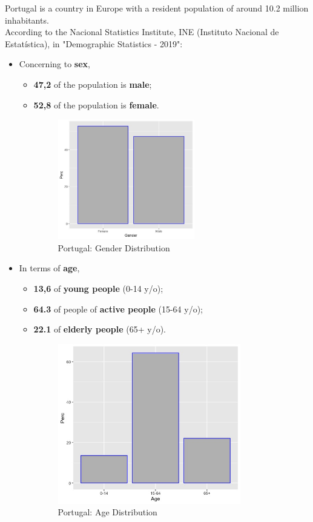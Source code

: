 Portugal is a country in Europe with a resident population of around 10.2 million inhabitants.  \\
According to the Nacional Statistics Institute, INE (Instituto Nacional de Estatística),  \cite{pubINE} in "Demographic Statistics - 2019":
\begin{itemize}
    \item Concerning to \textbf{sex},
    \begin{itemize}
        \item \textbf{47,2\textdiscount} of the population is \textbf{male};
        \item \textbf{52,8 \textdiscount} of the population is \textbf{female}.
\begin{figure}[h!]
\caption{Portugal: Gender Distribution}
\centering
\includegraphics[width=0.6\textwidth]{Sex.jpeg}
\end{figure}
    \end{itemize}  
    \item In terms of \textbf{age},
    \begin{itemize}
        \item \textbf{13,6\textdiscount} of \textbf{young people} (0-14 y/o);
        \item \textbf{64.3\textdiscount} of people of \textbf{active people} (15-64 y/o);
        \item \textbf{22.1\textdiscount} of \textbf{elderly people} (65+ y/o). 
\begin{figure}[h!]
\caption{Portugal: Age Distribution}
\centering
\includegraphics[width=0.8\textwidth]{Age.jpeg}
\end{figure}
    \end{itemize}
\end{itemize}
